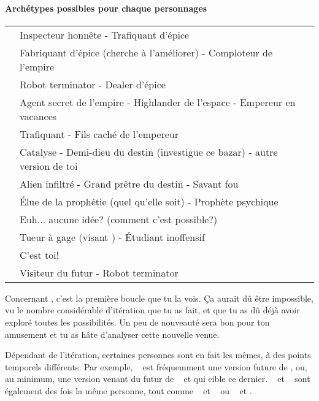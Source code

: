 {	\paragraph{Archétypes possibles pour chaque personnages}
	\begin{center}
	\begin{tabular}{|l||l|}
		\hline
		\emph{\nmPlayerVII} & Inspecteur honnête - Trafiquant d'épice\\
		\emph{\nmPlayerXII} & Fabriquant d'épice (cherche à l'améliorer) - Comploteur de l'empire\\
		\emph{\nmPlayerVIII} & Robot terminator - Dealer d'épice\\
		\emph{\nmPlayerX} & Agent secret de l'empire - Highlander de l'espace - Empereur en vacances\\
		\emph{\nmPlayerII} & Trafiquant - Fils caché de l'empereur\\
		\emph{\nmPlayerXI} & Catalyse - Demi-dieu du destin (investigue ce bazar) - autre version de toi\\
		\emph{\nmPlayerI} & Alien infiltré - Grand prêtre du destin - Savant fou\\
		\emph{\nmPlayerIX} & Élue de la prophétie (quel qu'elle soit) - Prophète psychique\\
		\emph{\nmPlayerVI} & Euh... aucune idée? (comment c'est possible?)\\
		\emph{\nmPlayerIII} & Tueur à gage (visant \nmPlayerX) - Étudiant inoffensif\\
		\emph{\nmPlayerIV} & C'est toi!\\
		\emph{\nmPlayerV} & Visiteur du futur - Robot terminator\\
		\hline
	\end{tabular}
	\end{center}
	\par Concernant \nmPlayerVI, c'est la première boucle que tu la vois. Ça aurait dû être impossible, vu le nombre considérable d'itération que tu as fait, et que tu as dû déjà avoir exploré toutes les possibilités. Un peu de nouveauté sera bon pour ton amusement et tu as hâte d'analyser cette nouvelle venue.
	
	\par Dépendant de l'itération, certaines personnes sont en fait les mêmes, à des points temporels différents. Par exemple, \nmPlayerV ~ est fréquemment une version future de \nmPlayerVII, ou, au minimum, une version venant du futur de \nmPlayerVII ~ et qui cible ce dernier. \nmPlayerII ~ et \nmPlayerIII ~ sont également des fois la même personne, tout comme \nmPlayerX ~ et \nmPlayerVIII ~ ou \nmPlayerXII ~ et \nmPlayerIII.
	
}
